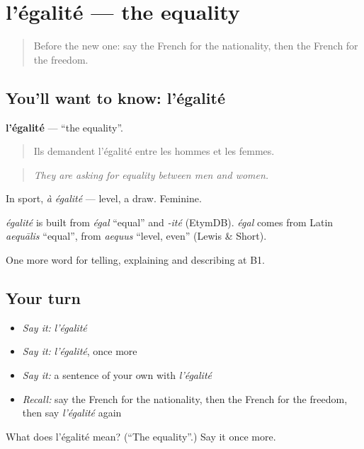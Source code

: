 \section[l'égalité]{l'égalité — the equality}

\label{lesson:FR-C362-egalite}



\begin{quote}
Before the new one: say the French for the nationality, then the French for the freedom.
\end{quote}

\subsection*{You'll want to know: l'égalité}
\textbf{l'égalité} — \textquotedblleft{}the equality\textquotedblright{}.

\begin{quote}
Ils demandent l'égalité entre les hommes et les femmes.
\end{quote}

\begin{quote}
\emph{They are asking for equality between men and women.}
\end{quote}

In sport, \emph{à égalité} — level, a draw. Feminine.

\begin{cousinweb}
\emph{égalité} is built from \emph{égal} \textquotedblleft{}equal\textquotedblright{} and \emph{-ité} (EtymDB). \emph{égal} comes from Latin \emph{aequālis} \textquotedblleft{}equal\textquotedblright{}, from \emph{aequus} \textquotedblleft{}level, even\textquotedblright{} (Lewis \& Short).
\end{cousinweb}

\begin{grammarlens}[title={What you've built}]
One more word for telling, explaining and describing at B1.
\end{grammarlens}

\subsection*{Your turn}
\begin{itemize}
\raggedright
  \item \emph{Say it:} \emph{l'égalité}
  \item \emph{Say it:} \emph{l'égalité}, once more
  \item \emph{Say it:} a sentence of your own with \emph{l'égalité}
  \item \emph{Recall:} say the French for the nationality, then the French for the freedom, then say \emph{l'égalité} again
\end{itemize}

\begin{tcolorbox}[breakable,colback=teal!4,colframe=teal!35!black,title={Before you move on}]
What does l'égalité mean? (\textquotedblleft{}The equality\textquotedblright{}.) Say it once more.
\end{tcolorbox}
